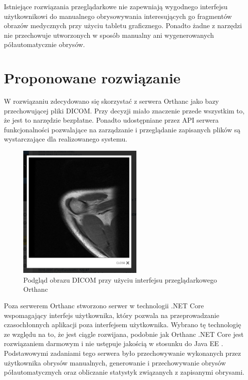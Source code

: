 \documentclass[a4paper,11pt,twoside,openright]{report}
\theoremstyle{definition}
\begin{document}
Istniejące rozwiązania przeglądarkowe nie zapewniają wygodnego interfejsu użytkownikowi
do manualnego obrysowywania interesujących go fragmentów obrazów medycznych przy użyciu tabletu graficznego.
Ponadto żadne z narzędzi nie przechowuje utworzonych w sposób manualny
ani wygenerowanych półautomatycznie obrysów.

\section {Proponowane rozwiązanie}

W rozwiązaniu zdecydowano się skorzystać z serwera Orthanc jako bazy przechowującej
pliki DICOM. Przy decyzji miało znaczenie przede wszystkim to, że jest to narzędzie
bezpłatne. Ponadto udostępniane przez API serwera funkcjonalności pozwalające na
zarządzanie i przeglądanie zapisanych plików są wystarczające dla realizowanego systemu.

\begin{figure}[b!]
	\center
	\includegraphics[width=0.55\textwidth]{Orthanc-preview}
	\caption{Podgląd obrazu DICOM przy użyciu interfejsu przeglądarkowego Orthanc}
    	\label{fig:Orthanc-preview}
\end{figure}

Poza serwerem Orthanc stworzono serwer w technologii .NET Core \cite{Dotnet}
wspomagający interfejs użytkownika, który pozwala na przeprowadzanie czasochłonnych
aplikacji poza interfejsem użytkownika. Wybrano tę technologię ze względu na to,
że jest ciągle rozwijana, podobnie jak Orthanc .NET Core jest rozwiązaniem darmowym
i nie ustępuje jakością w stosunku do Java EE \cite{Dlaczego dotnet}.
Podstawowymi zadaniami tego serwera było przechowywanie
wykonanych przez użytkownika obrysów manualnych, generowanie i przechowywanie
obrysów półautomatycznych oraz obliczanie statystyk związanych z zapisanymi obrysami.
\end{document}
